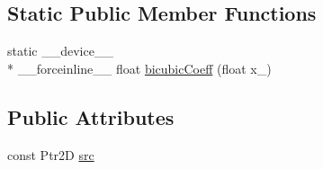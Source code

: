 \subsection*{Static Public Member Functions}
\begin{DoxyCompactItemize}
\item 
static \-\_\-\-\_\-device\-\_\-\-\_\- \\*
\-\_\-\-\_\-forceinline\-\_\-\-\_\- float \hyperlink{structcv_1_1gpu_1_1device_1_1CubicFilter_a61b84b1e8dbe679eac074b0e5aa6bf5f}{bicubic\-Coeff} (float x\-\_\-)
\end{DoxyCompactItemize}
\subsection*{Public Attributes}
\begin{DoxyCompactItemize}
\item 
const Ptr2\-D \hyperlink{structcv_1_1gpu_1_1device_1_1CubicFilter_a174b1388cc09fe57c4ffb92836b53638}{src}
\end{DoxyCompactItemize}


